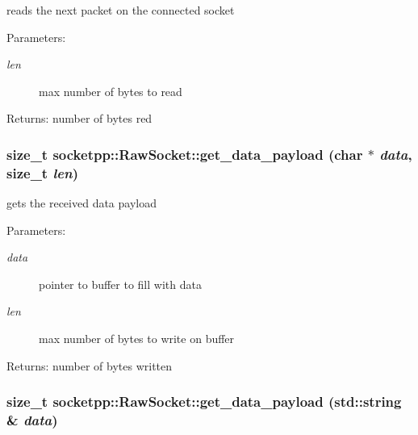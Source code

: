 reads the next packet on the connected socket 

\begin{Desc}
\item[Parameters:]
\begin{description}
\item[{\em len}]max number of bytes to read \end{description}
\end{Desc}
\begin{Desc}
\item[Returns:]number of bytes red \end{Desc}
\hypertarget{classsocketpp_1_1RawSocket_bd9631abfa5165ad4ed9e2a31640d1f0}{
\subsubsection{\setlength{\rightskip}{0pt plus 5cm}size\_\-t socketpp::RawSocket::get\_\-data\_\-payload (char $\ast$ {\em data}, \/  size\_\-t {\em len})}}
\label{classsocketpp_1_1RawSocket_bd9631abfa5165ad4ed9e2a31640d1f0}


gets the received data payload 

\begin{Desc}
\item[Parameters:]
\begin{description}
\item[{\em data}]pointer to buffer to fill with data \item[{\em len}]max number of bytes to write on buffer \end{description}
\end{Desc}
\begin{Desc}
\item[Returns:]number of bytes written \end{Desc}
\hypertarget{classsocketpp_1_1RawSocket_de47c63d60cba25d1ae82f242851610d}{
\subsubsection{\setlength{\rightskip}{0pt plus 5cm}size\_\-t socketpp::RawSocket::get\_\-data\_\-payload (std::string \& {\em data})}}
\label{classsocketpp_1_1RawSocket_de47c63d60cba25d1ae82f242851610d}



